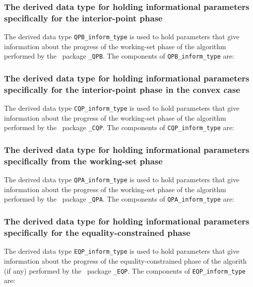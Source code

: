 \documentclass{galahad}
\begin{document}

\subsubsection{The derived data type for holding informational
 parameters specifically for the interior-point phase}\label{typeqpbinform}


The derived data type 
{\tt QPB\_inform\_type} 
is used to hold parameters that give information about the progress 
of the working-set phase of the algorithm
performed by the \libraryname\ package {\tt \libraryname\_QPB}.
The components of 
{\tt QPB\_inform\_type} 
are:




\subsubsection{The derived data type for holding informational
 parameters specifically for the interior-point phase in the convex case}\label{typecqpinform}

The derived data type 
{\tt CQP\_inform\_type} 
is used to hold parameters that give information about the progress 
of the working-set phase of the algorithm
performed by the \libraryname\ package {\tt \libraryname\_CQP}.
The components of 
{\tt CQP\_inform\_type} 
are:




\subsubsection{The derived data type for holding informational
 parameters specifically from the working-set phase}\label{typeqpainform}
The derived data type 
{\tt QPA\_inform\_type} 
is used to hold parameters that give information about the progress 
of the working-set phase of the algorithm
performed by the \libraryname\ package {\tt \libraryname\_QPA}.
The components of 
{\tt QPA\_inform\_type} 
are:




\subsubsection{The derived data type for holding informational
 parameters specifically for the equality-constrained phase}\label{typeeqpinform}
The derived data type 
{\tt EQP\_inform\_type} 
is used to hold parameters that give information about the progress 
of the equality-constrained phase of the algorith (if any)
performed by the \libraryname\ package {\tt \libraryname\_EQP}.
The components of 
{\tt EQP\_inform\_type} 
are:
\end{document}
